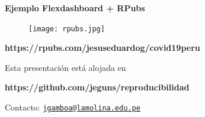 \documentclass[
  ignorenonframetext,
  aspectratio=169]{beamer}
\begin{document}
\begin{frame}

\textbf{Ejemplo Flexdashboard + RPubs}

\begin{figure}
\texttt{[image: rpubs.jpg]}
\end{figure}

\begin{center}
\textbf{https://rpubs.com/jesuseduardog/covid19peru}
\end{center}

\end{frame}

\begin{frame}

Esta presentación está alojada en

\begin{center}
\textbf{https://github.com/jeguns/reproducibilidad}
\end{center}

Contacto:
\href{mailto:jgamboa@lamolina.edu.pe}{\nolinkurl{jgamboa@lamolina.edu.pe}}

\end{frame}
\end{document}
